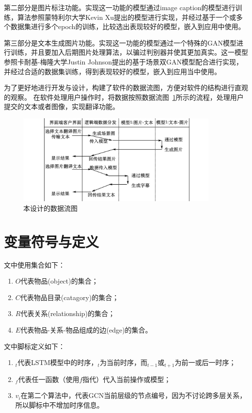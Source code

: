 第二部分是图片标注功能。实现这一功能的模型通过image caption的模型进行训练，算法参照蒙特利尔大学Kevin Xu提出的模型进行实现，并经过基于一个或多个数据集进行多个epoch的训练，比较选出表现较好的模型，嵌入到应用中使用。

第三部分是文本生成图片功能。实现这一功能的模型通过一个特殊的GAN模型进行训练，并且要加入后期图片处理算法，以骗过判别器并使其更加真实。这一模型参照卡耐基-梅隆大学Justin Johnson提出的基于场景双GAN模型配合进行实现，并经过合适的数据集训练，得到表现较好的模型，嵌入到应用当中使用。

为了更好地进行开发与设计，构建了软件的数据流图，方便对软件的结构进行直观的观察。
在软件处理用户操作时，将数据按照数据流图~\ref{fig:dataflow}所示的流程，处理用户提交的文本或者图像，实现翻译功能。

\begin{figure}
    \centering
    \includegraphics[width=0.9\textwidth]{figures/数据流图.png}
    \caption{本设计的数据流图}
    \label{fig:dataflow}
\end{figure}

\section{变量符号与定义}
文中使用集合如下：
\begin{enumerate}[fullwidth,itemindent=2em,label=\arabic*.]
    \item $O$代表物品(object)的集合；
    \item $C$代表物品目录(catagory)的集合；
    \item $R$代表关系(relationship)的集合；
    \item $E$代表物品-关系-物品组成的边(edge)的集合。
\end{enumerate}

文中脚标定义如下：
\begin{enumerate}[fullwidth,itemindent=2em,label=\arabic*.]
    \item ${}_t$代表LSTM模型中的时序，${}_t$为当前时序，而${}_{t-1}$或${}_{t+1}$为前一或后一时序；
    \item $_f$代表任一函数（使用$f$指代）代入当前操作或模型；
    \item $v_i$在第二个算法中，代表GCN当前层级的节点编号，因为不讨论跨多层关系，所以脚标中不增加时序信息。
\end{enumerate}

